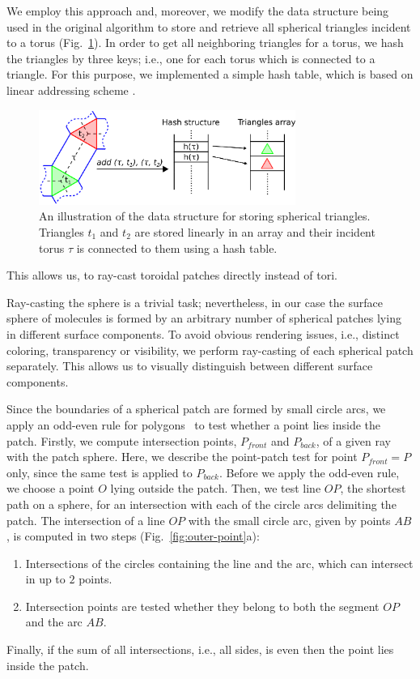 We employ this approach and, moreover, we modify the data structure being used in the original algorithm to store and retrieve all spherical triangles incident to a torus (Fig.~\ref{fig:hashing}). In order to get all neighboring triangles for a torus, we hash the triangles by three keys; i.e., one for each torus which is connected to a triangle.
For this purpose, we implemented a simple hash table, which is based on linear addressing scheme \cite{alcantara2011efficient}.
\begin{figure}[htb]
  \centering
  \includegraphics[width=3.3in]{image/hashing.png}
  \caption{An illustration of the data structure for storing spherical triangles. Triangles $t_1$ and $t_2$ are stored linearly in an array and their incident torus $\tau$ is connected to them using a hash table.}
	\label{fig:hashing}
\end{figure}
This allows us, to ray-cast toroidal patches directly instead of tori.


Ray-casting the sphere is a trivial task; nevertheless, in our case the surface sphere of molecules is formed by an arbitrary number of spherical patches lying in different surface components. To avoid obvious rendering issues, i.e., distinct coloring, transparency or visibility, we perform ray-casting of each spherical patch separately.
This allows us to visually distinguish between different surface components.

Since the boundaries of a spherical patch are formed by small circle arcs, we apply an odd-even rule for polygons~\cite{shimrat1962algorithm} to test whether a point lies inside the patch. Firstly, we compute intersection points, $P_{front}$ and $P_{back}$, of a given ray with the patch sphere.
Here, we describe the point-patch test for point $P_{front}=P$ only, since the same test is applied to $P_{back}$.
Before we apply the odd-even rule, we choose a point $O$ lying outside the patch.
Then, we test line $OP$, the shortest path on a sphere, for an intersection with each of the circle arcs delimiting the patch.
The intersection of a line $OP$ with the small circle arc, given by points $AB$, is computed in two steps (Fig.~\ref{fig:outer-point}a):
\begin{enumerate}
  \item Intersections of the circles containing the line and the arc, which can intersect in up to $2$ points.
  \item Intersection points are tested whether they belong to both the segment $OP$ and the arc $AB$.
\end{enumerate}
Finally, if the sum of all intersections, i.e., all sides, is even then the point lies inside the patch.


